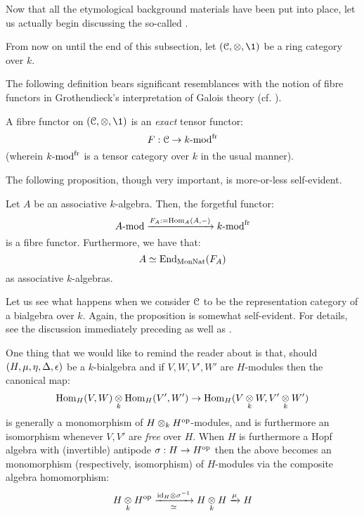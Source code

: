             Now that all the etymological background materials have been put into place, let us actually begin discussing the so-called . 
            \begin{convention}
                From now on until the end of this subsection, let $(\C, \tensor, \1)$ be a ring category over $k$. 
            \end{convention}
            The following definition bears significant resemblances with the notion of fibre functors in Grothendieck's interpretation of Galois theory (cf. \cite[Expos\'e V]{SGA1}).
            \begin{definition} \label{def: fibre_functors}
                A fibre functor on $(\C, \tensor, \1)$ is an \textit{exact} tensor functor:
                    $$F: \mathcal{C} \to k\text{-}\mathrm{mod}^{\mathrm{fr}}$$
                (wherein $k\text{-}\mathrm{mod}^{\mathrm{fr}}$ is a tensor category over $k$ in the usual manner).
            \end{definition}
            The following proposition, though very important, is more-or-less self-evident. 
            \begin{proposition} \label{prop: fibre_functors_for_representation_categories_of_associative_algebras}
                Let $A$ be an associative $k$-algebra. Then, the forgetful functor:
                    $$A\text{-}\mathrm{mod} \xrightarrow[]{F_A := \mathrm{Hom}_A(A, -)} k\text{-}\mathrm{mod}^{\mathrm{fr}}$$
                is a fibre functor. Furthermore, we have that:
                    $$A \simeq \mathrm{End}_{\mathrm{Mon}\mathrm{Nat}}(F_A)$$
                as associative $k$-algebras. 
            \end{proposition}
            Let us see what happens when we consider $\mathcal{C}$ to be the representation category of a bialgebra over $k$. Again, the proposition is somewhat self-evident. For details, see the discussion immediately preceding \cite[Section 5.2]{EGNO} as well as \cite[Section 5.3]{EGNO}.
            \begin{remark}
                One thing that we would like to remind the reader about is that, should $(H, \mu, \eta, \Delta, \epsilon)$ be a $k$-bialgebra and if $V, W, V', W'$ are $H$-modules then the canonical map:
                    $$\Hom_H(V, W) \tensor_k \Hom_H(V', W') \to \Hom_H(V \tensor_k W, V' \tensor_k W')$$
                is generally a monomorphism of $H \tensor_k H^{\op}$-modules, and is furthermore an isomorphism whenever $V, V'$ are \textit{free} over $H$. When $H$ is furthermore a Hopf algebra with (invertible) antipode $\sigma: H \to H^{\mathrm{op}}$ then the above becomes an monomorphism (respectively, isomorphism) of $H$-modules via the composite algebra homomorphism:
                    $$H \tensor_k H^{\op} \xrightarrow[\cong]{\id_H \tensor \sigma^{-1}} H \tensor_k H \xrightarrow[]{\mu} H$$
            \end{remark}
